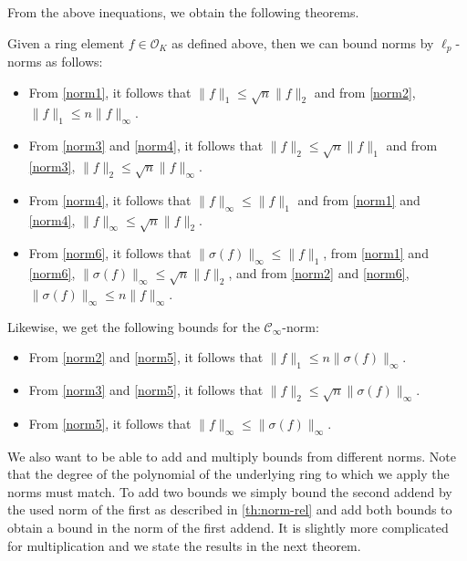 From the above inequations, we obtain the following theorems.
\begin{theorem}\label{th:norm-rel}
    Given a ring element $f \in \mathcal{O}_K$ as defined above, then we can bound norms by $\ell_p$-norms as follows:
    \begin{itemize}
        \item From \cref{norm1}, it follows that $\| f \|_1 \leq \sqrt{n} \| f \|_2$ and from \cref{norm2}, $\| f \|_1 \leq n \| f \|_\infty$.
        \item From \cref{norm3} and \cref{norm4}, it follows that $\| f \|_2 \leq \sqrt{n}  \| f \|_1$ and from \cref{norm3}, $\| f \|_2 \leq \sqrt{n}  \| f \|_\infty$.
        \item From \cref{norm4}, it follows that $\| f \|_\infty \leq  \| f \|_1$ and from \cref{norm1} and \cref{norm4}, $\| f \|_\infty \leq \sqrt{n}  \| f \|_2$.
        \item From \cref{norm6}, it follows that $\| \sigma(f) \|_\infty \leq  \| f \|_1$, from \cref{norm1} and \cref{norm6}, $\| \sigma(f) \|_\infty \leq \sqrt{n}  \| f \|_2$, and from \cref{norm2} and \cref{norm6}, $\| \sigma(f) \|_\infty \leq n  \| f \|_\infty$.
    \end{itemize}
    Likewise, we get the following bounds for the $\mathcal{C}_\infty$-norm:
    \begin{itemize}
        \item From \cref{norm2} and \cref{norm5}, it follows that $\| f \|_1 \leq  n \| \sigma(f) \|_\infty$.
        \item From \cref{norm3} and \cref{norm5}, it follows that $\| f \|_2 \leq  \sqrt{n} \| \sigma(f) \|_\infty$.
        \item From \cref{norm5}, it follows that $\| f \|_\infty \leq  \| \sigma(f) \|_\infty$.
    \end{itemize}
\end{theorem}

We also want to be able to add and multiply bounds from different norms. Note that the degree of the polynomial of the underlying ring to which we apply the norms must match. To add two bounds we simply bound the second addend by the used norm of the first as described in \cref{th:norm-rel} and add both bounds to obtain a bound in the norm of the first addend. It is slightly more complicated for multiplication and we state the results in the next theorem.

